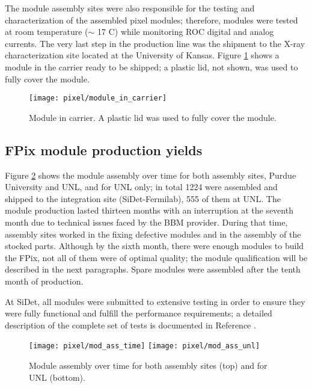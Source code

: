 The module assembly sites were also responsible for the testing and characterization of the assembled pixel modules; therefore, modules were tested at room temperature ($\sim$ 17 C) while monitoring ROC digital and analog currents. The very last step in the production line was the shipment to the X-ray characterization site located at the University of Kansas. Figure \ref{fig:module_in_carrier} shows a module in the carrier ready to be shipped; a plastic lid, not shown, was used to fully cover the module.       

\begin{figure}[h]
\begin{center}
  \texttt{[image: pixel/module\_in\_carrier]}
 \caption[Module in carrier.]{Module in carrier. A plastic lid was used to fully cover the module.}\label{fig:module_in_carrier}
\end{center}
\end{figure}

\subsection{FPix module production yields}

Figure \ref{fig:mod_ass_time} shows the module assembly over time for both assembly sites, Purdue University and UNL, and for UNL only; in total 1224 were assembled and shipped to the integration site (SiDet-Fermilab), 555 of them at UNL. The module production lasted thirteen months with an interruption at the seventh month due to technical issues faced by the BBM provider. During that time, assembly sites worked in the fixing defective modules and in the assembly of the stocked parts. Although by the sixth month, there were enough modules to build the FPix, not all of them were of optimal quality; the module qualification will be described in the next paragraphs. Spare modules were assembled after the tenth month of production.     

At SiDet, all modules were submitted to extensive testing in order to ensure they were fully functional and fulfill the performance requirements; a detailed description of the complete set of tests is documented in Reference \cite{fpix_module_testing_guide}.

\begin{figure}[h]
\begin{center}
  \texttt{[image: pixel/mod\_ass\_time]}
  \texttt{[image: pixel/mod\_ass\_unl]}
 \caption[Module assembly over time.]{Module assembly over time for both assembly sites (top) and for UNL (bottom).}\label{fig:mod_ass_time}
\end{center}
\end{figure}

